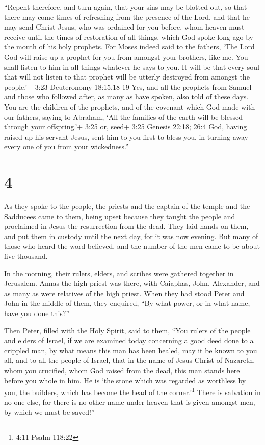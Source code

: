  ``Repent therefore, and turn again, that your sins may be
blotted out, so that there may come times of refreshing from the
presence of the Lord,  and that he may send Christ Jesus,
who was ordained for you before,  whom heaven must receive
until the times of restoration of all things, which God spoke long ago
by the mouth of his holy prophets.  For Moses indeed said
to the fathers, `The Lord God will raise up a prophet for you from
amongst your brothers, like me. You shall listen to him in all things
whatever he says to you.  It will be that every soul that
will not listen to that prophet will be utterly destroyed from amongst
the people.'+ 3:23 Deuteronomy 18:15,18-19  Yes, and all
the prophets from Samuel and those who followed after, as many as have
spoken, also told of these days.  You are the children of
the prophets, and of the covenant which God made with our fathers,
saying to Abraham, `All the families of the earth will be blessed
through your offspring.'+ 3:25 or, seed+ 3:25 Genesis 22:18; 26:4
 God, having raised up his servant Jesus, sent him to you
first to bless you, in turning away every one of you from your
wickedness.''

\hypertarget{section-3}{%
\section{4}\label{section-3}}

 As they spoke to the people, the priests and the captain of
the temple and the Sadducees came to them,  being upset
because they taught the people and proclaimed in Jesus the resurrection
from the dead.  They laid hands on them, and put them in
custody until the next day, for it was now evening.  But
many of those who heard the word believed, and the number of the men
came to be about five thousand.

 In the morning, their rulers, elders, and scribes were
gathered together in Jerusalem.  Annas the high priest was
there, with Caiaphas, John, Alexander, and as many as were relatives of
the high priest.  When they had stood Peter and John in the
middle of them, they enquired, ``By what power, or in what name, have
you done this?''

 Then Peter, filled with the Holy Spirit, said to them,
``You rulers of the people and elders of Israel,  if we are
examined today concerning a good deed done to a crippled man, by what
means this man has been healed,  may it be known to you
all, and to all the people of Israel, that in the name of Jesus Christ
of Nazareth, whom you crucified, whom God raised from the dead, this man
stands here before you whole in him.  He is `the stone
which was regarded as worthless by you, the builders, which has become
the head of the corner.'\footnote{4:11 Psalm 118:22}  There
is salvation in no one else, for there is no other name under heaven
that is given amongst men, by which we must be saved!''

